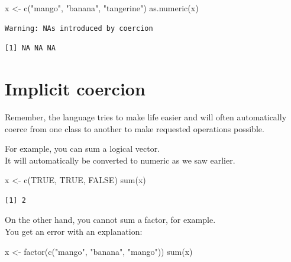 \documentclass[
]{book}
\newenvironment{Shaded}{\begin{snugshade}}{\end{snugshade}}
\newcommand{\ConstantTok}[1]{\textcolor[rgb]{0.00,0.00,0.00}{#1}}
\newcommand{\FunctionTok}[1]{\textcolor[rgb]{0.00,0.00,0.00}{#1}}
\newcommand{\NormalTok}[1]{#1}
\newcommand{\OtherTok}[1]{\textcolor[rgb]{0.56,0.35,0.01}{#1}}
\newcommand{\StringTok}[1]{\textcolor[rgb]{0.31,0.60,0.02}{#1}}
\begin{document}
\begin{Shaded}
\begin{Highlighting}[]
\NormalTok{x }\OtherTok{\textless{}{-}} \FunctionTok{c}\NormalTok{(}\StringTok{"mango"}\NormalTok{, }\StringTok{"banana"}\NormalTok{, }\StringTok{"tangerine"}\NormalTok{)}
\FunctionTok{as.numeric}\NormalTok{(x)}
\end{Highlighting}
\end{Shaded}

\begin{verbatim}
Warning: NAs introduced by coercion
\end{verbatim}

\begin{verbatim}
[1] NA NA NA
\end{verbatim}

\hypertarget{implicit-coercion}{%
\section{Implicit coercion}\label{implicit-coercion}}

Remember, the language tries to make life easier and will often automatically coerce from one class to another to make requested operations possible.

For example, you can sum a logical vector.\\
It will automatically be converted to numeric as we saw earlier.

\begin{Shaded}
\begin{Highlighting}[]
\NormalTok{x }\OtherTok{\textless{}{-}} \FunctionTok{c}\NormalTok{(}\ConstantTok{TRUE}\NormalTok{, }\ConstantTok{TRUE}\NormalTok{, }\ConstantTok{FALSE}\NormalTok{)}
\FunctionTok{sum}\NormalTok{(x)}
\end{Highlighting}
\end{Shaded}

\begin{verbatim}
[1] 2
\end{verbatim}

On the other hand, you cannot sum a factor, for example.\\
You get an error with an explanation:

\begin{Shaded}
\begin{Highlighting}[]
\NormalTok{x }\OtherTok{\textless{}{-}} \FunctionTok{factor}\NormalTok{(}\FunctionTok{c}\NormalTok{(}\StringTok{"mango"}\NormalTok{, }\StringTok{"banana"}\NormalTok{, }\StringTok{"mango"}\NormalTok{))}
\FunctionTok{sum}\NormalTok{(x)}
\end{Highlighting}
\end{Shaded}
\end{document}

